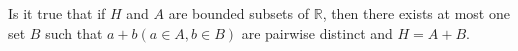 Is it true that if  $H$ and $A$ are  bounded subsets of $\mathbb{R}$, then there exists at most one set $B$ such that $a+b(a\in A,b\in B)$ are pairwise distinct and $H=A+B$.